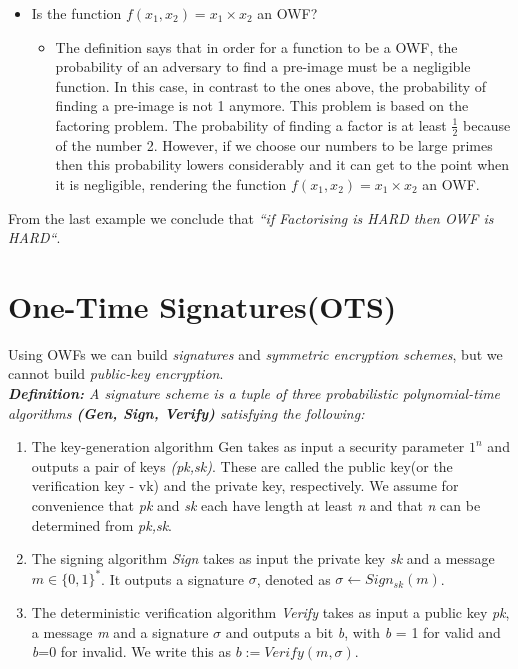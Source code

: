 \documentclass[oneside,a4paper,12pt]{book}
\begin{document}
\begin{itemize}
    \item Is the function \begin{math}f(x_1,x_2)=x_1\times x_2\end{math} an OWF?
    
    \begin{itemize}
    
        \item The definition says that in order for a function to be a OWF, the probability of an adversary to find a pre-image must be a negligible function. In this case, in contrast to the ones above, the probability of finding a pre-image is not 1 anymore. This problem is based on the factoring problem. The probability of finding a factor is at least $\frac {1}{2}$ because of the number 2. However, if we choose our numbers to be large primes then this probability lowers considerably and it can get to the point when it is negligible, rendering the function \begin{math}f(x_1,x_2)=x_1\times x_2\end{math} an OWF.
        
    \end{itemize}
    
\end{itemize}
    
From the last example we conclude that \textit{``if Factorising is HARD then OWF is HARD``}.

\section{One-Time Signatures(OTS)}

Using OWFs we can build \textit{signatures} and \textit{symmetric encryption schemes}, but we cannot build \textit{public-key encryption}.\\

\textit{\textbf{Definition:} A signature scheme is a tuple of three probabilistic polynomial-time algorithms \textbf{(Gen, Sign, Verify)} satisfying the following:}
\begin{enumerate}
    \item The key-generation algorithm Gen takes as input a security parameter $1^n$ and outputs a pair of keys \textit{(pk,sk)}. These are called the public key(or the verification key - vk) and the private key, respectively. We assume for convenience that \textit{pk} and \textit{sk} each have length at least \textit{n} and that \textit{n} can be determined from \textit{pk,sk}.
    \item The signing algorithm \textit{Sign} takes as input the private key \textit{sk} and a message $m \in \{0,1\}^*$. It outputs a signature $\sigma$, denoted as $\sigma \gets Sign_{sk}(m)$.
    \item The deterministic verification algorithm \textit{Verify} takes as input a public key \textit{pk}, a message \textit{m} and a signature $\sigma$ and outputs a bit \textit{b}, with \textit{b} = 1 for valid and \textit{b}=0 for invalid. We write this as $b:=Verify(m,\sigma)$.
\end{enumerate}
\end{document}
